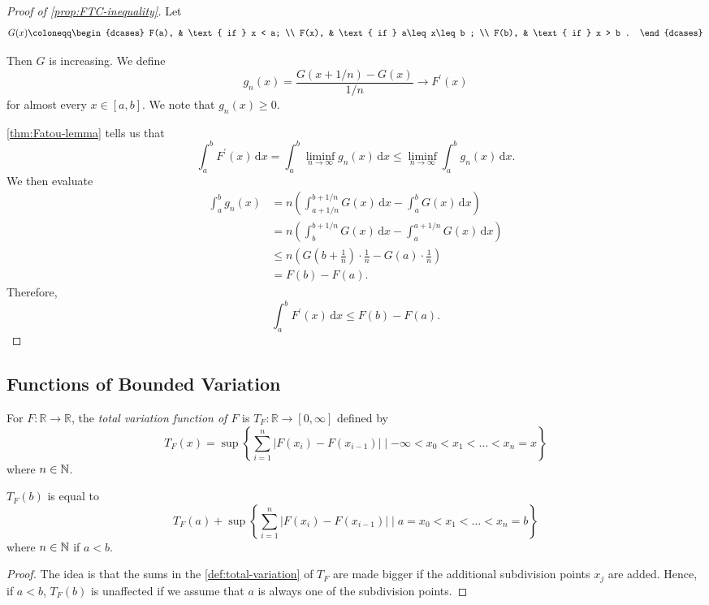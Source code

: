 \begin{proof}[Proof of \autoref{prop:FTC-inequality}]
	Let
	\[
		G(x)\coloneqq \begin{dcases}
			F(a), & \text{ if } x < a;          \\
			F(x), & \text{ if } a\leq x\leq b ; \\
			F(b), & \text{ if } x > b .
		\end{dcases}
	\]

	Then \(G\) is increasing. We define
	\[
		g_n(x) = \frac{G(x+1/n)- G(x)}{1/n} \to F^\prime (x)
	\]
	for almost every \(x \in [a,b]\). We note that \(g_n(x) \geq 0\).

	\autoref{thm:Fatou-lemma} tells us that
	\[
		\int_a^b F^\prime (x) \,\mathrm{d} x = \int_a^b \liminf_{n \to \infty} g_n(x) \,\mathrm{d} x \leq \liminf_{n \to \infty} \int_a^b g_n(x) \,\mathrm{d} x.
	\]
	We then evaluate
	\[
		\begin{split}
			\int_a^b g_n(x) &= n\left( \int_{a+1/n}^{b+1/n} G(x) \,\mathrm{d} x - \int_a^b G(x) \,\mathrm{d} x \right)  \\
			&= n\left( \int_b^{b+1/n} G(x) \,\mathrm{d} x - \int_a^{a+1/n} G(x) \,\mathrm{d} x \right) \\
			&\leq n\left( G\left( b + \frac{1}{n} \right) \cdot \frac{1}{n} - G(a) \cdot \frac{1}{n}  \right) \\
			&= F(b) - F(a).
		\end{split}
	\]
	Therefore,
	\[
		\int_a^b F^\prime (x) \,\mathrm{d} x \leq F(b) - F(a).
	\]
\end{proof}

\subsection{Functions of Bounded Variation}
\begin{definition}\label{def:total-variation-function}
	For \(F \colon \mathbb{R} \to \mathbb{R}\), the \emph{total variation function of \(F\)} is \(T_F \colon \mathbb{R} \to [0,\infty]\) defined by
	\[
		T_F(x) = \sup \left\{\sum_{i=1}^n \left\vert F(x_i) - F(x_{i-1}) \right\vert \mid -\infty < x_0 < x_1 < \ldots < x_n = x\right\}
	\]
	where \(n \in \mathbb{\MakeUppercase{n}}\).
\end{definition}

\begin{lemma}
	\(T_F(b)\) is equal to
	\[
		T_F(a) + \sup \left\{\sum_{i=1}^n \left\vert F(x_i) - F(x_{i-1}) \right\vert \mid a = x_0 < x_1 < \ldots < x_n = b\right\}
	\]
	where \(n \in \mathbb{\MakeUppercase{n}}\) if \(a < b\).
\end{lemma}
\begin{proof}
	The idea is that the sums in the \autoref{def:total-variation} of \(T_F\) are made bigger if the additional subdivision points \(x_{j} \) are added. Hence,
	if \(a <b\), \(T_F(b)\) is unaffected if we assume that \(a\) is always one of the subdivision points.
\end{proof}

